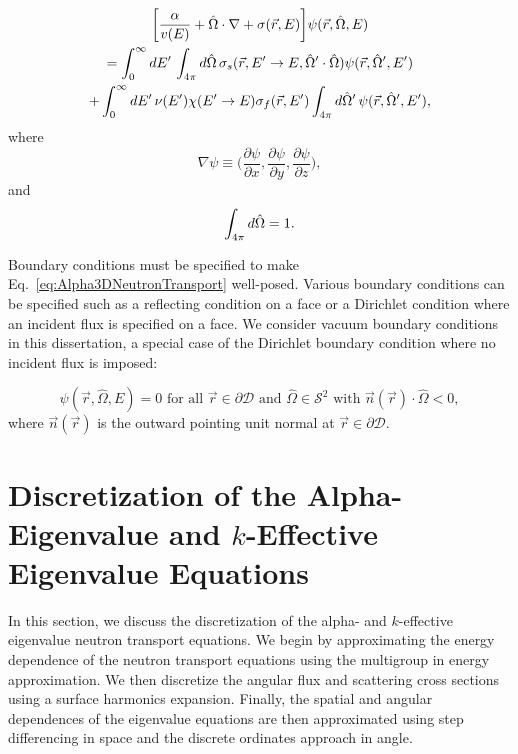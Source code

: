 \begin{multline}
	\bigg [ \frac{\alpha}{v(E)} + \hat{\Omega} \cdot \nabla + \sigma(\vec{r},E) \bigg ] \psi(\vec{r},\hat{\Omega},E) \\ = \int_{0}^{\infty} \mathop{}\!d E' \, \int_{4\pi} \mathop{}\!d \hat{\Omega} \, \sigma_{s}(\vec{r},E'\rightarrow E,\hat{\Omega}' \cdot \hat{\Omega}) \psi(\vec{r},\hat{\Omega}',E') \\ + \int_{0}^{\infty} \mathop{}\!d E' \, \nu(E') \chi(E'\rightarrow E) \sigma_{f}(\vec{r},E') \int_{4\pi} \mathop{}\!d \hat{\Omega}' \, \psi(\vec{r},\hat{\Omega}',E'), 
	\label{eq:Alpha3DNeutronTransport}
\end{multline}
where
\begin{equation}
	\nabla \psi \equiv \bigg (\frac{\partial \psi}{\partial x}, \frac{\partial \psi}{\partial y}, \frac{\partial \psi}{\partial z} \bigg ),
\end{equation}
and
\begin{equation}
	 \int_{4\pi} \mathop{}\!d \hat{\Omega} = 1.
\end{equation}

Boundary conditions must be specified to make Eq.~\ref{eq:Alpha3DNeutronTransport} well-posed. Various boundary conditions can be specified such as a reflecting condition on a face or a Dirichlet condition where an incident flux is specified on a face. We consider vacuum boundary conditions in this dissertation, a special case of the Dirichlet boundary condition where no incident flux is imposed:

\begin{equation}
	\psi(\vec{r},\hat{\Omega},E) = 0 \text{ for all } \vec{r} \in \partial \mathcal{D} \text{ and } \hat{\Omega} \in \mathcal{S}^{2} \text{ with } \vec{n}(\vec{r}) \cdot \hat{\Omega} < 0,
\end{equation}
where $\vec{n}(\vec{r})$ is the outward pointing unit normal at $\vec{r} \in \partial \mathcal{D}$.

\section{Discretization of the Alpha-Eigenvalue and $k$-Effective Eigenvalue Equations}

In this section, we discuss the discretization of the alpha- and $k$-effective eigenvalue neutron transport equations. We begin by approximating the energy dependence of the neutron transport equations using the multigroup in energy approximation. We then discretize the angular flux and scattering cross sections using a surface harmonics expansion. Finally, the spatial and angular dependences of the eigenvalue equations are then approximated using step differencing in space and the discrete ordinates approach in angle.

